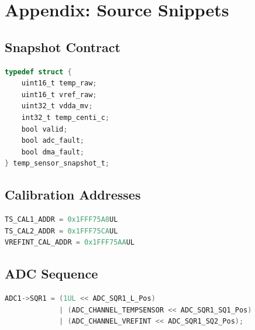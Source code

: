 \documentclass[11pt,a4paper]{article}
\begin{document}
\section{Appendix: Source Snippets}

\subsection{Snapshot Contract}

\begin{lstlisting}[language=C]
typedef struct {
    uint16_t temp_raw;
    uint16_t vref_raw;
    uint32_t vdda_mv;
    int32_t temp_centi_c;
    bool valid;
    bool adc_fault;
    bool dma_fault;
} temp_sensor_snapshot_t;
\end{lstlisting}

\subsection{Calibration Addresses}

\begin{lstlisting}[language=C]
TS_CAL1_ADDR = 0x1FFF75A8UL
TS_CAL2_ADDR = 0x1FFF75CAUL
VREFINT_CAL_ADDR = 0x1FFF75AAUL
\end{lstlisting}

\subsection{ADC Sequence}

\begin{lstlisting}[language=C]
ADC1->SQR1 = (1UL << ADC_SQR1_L_Pos)
             | (ADC_CHANNEL_TEMPSENSOR << ADC_SQR1_SQ1_Pos)
             | (ADC_CHANNEL_VREFINT << ADC_SQR1_SQ2_Pos);
\end{lstlisting}
\end{document}
